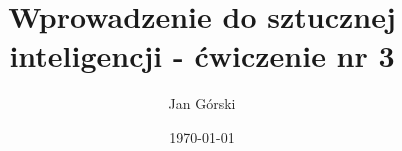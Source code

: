 


  \title{Wprowadzenie do sztucznej inteligencji - ćwiczenie nr 3}
  \author{Jan Górski}
  \date{\today}

  

  \maketitle

  \begin{sloppypar}

    \newpage

    \tableofcontents

    \newpage
    
    \newpage
    
    \newpage
    
    \newpage
    

%    
	\newpage

  \end{sloppypar}

